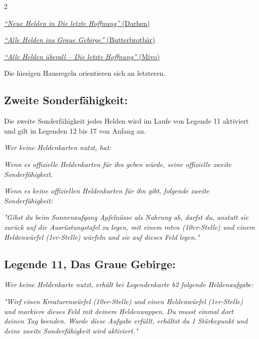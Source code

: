 \documentclass[10pt, a4paper, oneside]{book}
\newcommand{\fan}[1]{\textit{#1}}
\begin{document}
\begin{multicols*}{2}
\begin{bgcolor}
\href{https://legenden-von-andor.de/forum/viewtopic.php?p=103303#p103303}
{\blacktriangleright \fan{\enquote{Neue Helden in Die letzte Hoffnung}} (Darhen)}

\href{https://legenden-von-andor.de/forum/viewtopic.php?p=56931#p56931}
{\blacktriangleright \fan{\enquote{Alle Helden ins Graue Gebirge}} (Butterbrotbär)}

\href{https://legenden-von-andor.de/forum/viewtopic.php?p=136266#p136266}
{\blacktriangleright \fan{\enquote{Alle Helden überall – Die letzte Hoffnung}} (Mivo)}

Die hiesigen Hausregeln orientieren sich an letzteren.





\subsection{Zweite Sonderfähigkeit:}

Die zweite Sonderfähigkeit jedes Helden wird im Laufe von Legende 11 aktiviert und gilt in Legenden 12 bis 17 von Anfang an.


\fan{Wer keine Heldenkarten nutzt, hat:}

\bullet{} \fan{Wenn es offizielle Heldenkarten für ihn geben würde, seine offizielle zweite Sonderfähigkeit.}

\columnbreak

\bullet{} \fan{Wenn es keine offiziellen Heldenkarten für ihn gibt, folgende zweite Sonderfähigkeit:}

\fan{"Gibst du beim Sonnenaufgang Apfelnüsse als Nahrung ab, darfst du, anstatt sie zurück auf die Ausrüstungstafel zu legen, mit einem roten (10er-Stelle) und einem Heldenwürfel (1er-Stelle) würfeln und sie auf dieses Feld legen."}
\supercite{128906}









\subsection{Legende 11, Das Graue Gebirge:}

\fan{Wer keine Heldenkarte nutzt, erhält bei Legendenkarte b2 folgende Heldenaufgabe:}

\fan{"Wirf einen Kreaturenwürfel (10er-Stelle) und einen Heldenwürfel (1er-Stelle) und markiere dieses Feld mit deinem Heldenwappen. Du musst einmal dort deinen Tag beenden. Wurde diese Aufgabe erfüllt, erhältst du 1 Stärkepunkt und deine zweite Sonderfähigkeit wird aktiviert."}





\end{bgcolor}
\end{multicols*}
\end{document}
